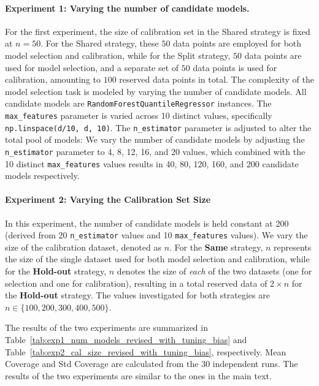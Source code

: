 \documentclass{article}
\newcommand{\1}{\mathbbm{1}}
\theoremstyle{plain}
\theoremstyle{definition}
\theoremstyle{remark}
\begin{document}
\paragraph{Experiment 1: Varying the number of candidate models.}
For the first experiment, the size of calibration set in the Shared strategy is fixed at $n = 50$.
For the Shared strategy, these $50$ data points are employed for both model selection and calibration, while for the Split strategy, $50$ data points are used for model selection, and a separate set of $50$ data points is used for calibration, amounting to $100$ reserved data points in total.
The complexity of the model selection task is modeled by varying the number of candidate models. 
All candidate models are \texttt{RandomForestQuantileRegressor} instances. The \texttt{max\_features} parameter is varied across 10 distinct values, specifically \texttt{np.linspace(d/10, d, 10)}. The \texttt{n\_estimator} parameter is adjusted to alter the total pool of models:
We vary the number of candidate models by adjusting the \texttt{n\_estimator} parameter to 4, 8, 12, 16, and 20 values, which combined with the 10 distinct \texttt{max\_features} values results in 40, 80, 120, 160, and 200 candidate models respectively.

\paragraph{Experiment 2: Varying the Calibration Set Size}
In this experiment, the number of candidate models is held constant at 200 (derived from 20 \texttt{n\_estimator} values and 10 \texttt{max\_features} values). We vary the size of the calibration dataset, denoted as $n$.
For the \textbf{Same} strategy, $n$ represents the size of the single dataset used for both model selection and calibration, while for the \textbf{Hold-out} strategy, $n$ denotes the size of \textit{each} of the two datasets (one for selection and one for calibration), resulting in a total reserved data of $2 \times n$ for the \textbf{Hold-out} strategy. The values investigated for both strategies are $n \in \{100, 200, 300, 400, 500\}$.


The results of the two experiments are summarized in Table~\ref{tab:exp1_num_models_revised_with_tuning_bias} and Table~\ref{tab:exp2_cal_size_revised_with_tuning_bias}, respectively. Mean Coverage and Std Coverage are calculated from the 30 independent runs. The results of the two experiments are similar to the ones in the main text.
\end{document}
